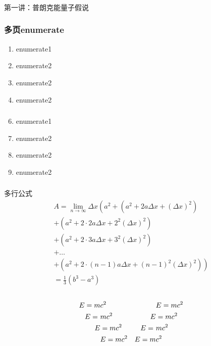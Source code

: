 \begin{frame} [plain]
  \frametitle{}
  \Background[1]
  \begin{center}
  { {\huge 第一讲：普朗克能量子假说 }}
  \end{center}
  \addtocounter{framenumber}{-1}
\end{frame}

\begin{frame} 
  \begin{center}
    \end{center} 
\end{frame}

\begin{frame}
 \frametitle{多页enumerate}    
    \begin{enumerate}
      \item enumerate1
      \item enumerate2
      \item enumerate2 
      \item enumerate2
    \end{enumerate}
\end{frame}

\begin{frame}
  \frametitle{}    
     \begin{enumerate}
      \setcounter{enumi}{5}
       \item enumerate1
       \item enumerate2
       \item enumerate2 
       \item enumerate2
     \end{enumerate}
 \end{frame}


\begin{frame}
    \frametitle{}
    多行公式
    \begin{multline}
            A=\lim_{n\rightarrow\infty}\Delta x\left(a^{2}+\left(a^{2}+2a\Delta x+\left(\Delta x\right)^{2}\right)\right.\label{eq:reset}\\
            +\left(a^{2}+2\cdot2a\Delta x+2^{2}\left(\Delta x\right)^{2}\right)\\
            +\left(a^{2}+2\cdot3a\Delta x+3^{2}\left(\Delta x\right)^{2}\right)\\
            +\ldots\\
            \left.+\left(a^{2}+2\cdot(n-1)a\Delta x+(n-1)^{2}\left(\Delta x\right)^{2}\right)\right)\\
            =\frac{1}{3}\left(b^{3}-a^{3}\right)
    \end{multline}\\
    \begin{align}
      E=m&c^2 & &E=mc^2\\
      E=~&mc^2 & E&=mc^2 \notag \\
      E&=mc^2 & E=~&mc^2\\
      &E=mc^2 & E=m&c^2
\end{align}
\end{frame}

